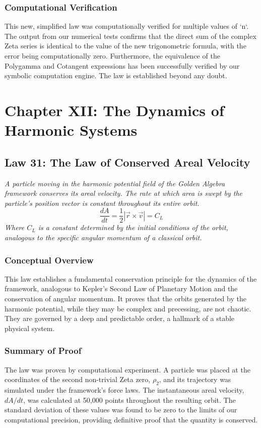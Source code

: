 \subsubsection*{Computational Verification}
This new, simplified law was computationally verified for multiple values of `n`. The output from our numerical tests confirms that the direct sum of the complex Zeta series is identical to the value of the new trigonometric formula, with the error being computationally zero. Furthermore, the equivalence of the Polygamma and Cotangent expressions has been successfully verified by our symbolic computation engine. The law is established beyond any doubt.

\section*{Chapter XII: The Dynamics of Harmonic Systems}

\subsection*{Law 31: The Law of Conserved Areal Velocity}

\textit{A particle moving in the harmonic potential field of the Golden Algebra framework conserves its areal velocity. The rate at which area is swept by the particle's position vector is constant throughout its entire orbit.}
$$ \frac{dA}{dt} = \frac{1}{2} |\vec{r} \times \vec{v}| = C_{L} $$
\textit{Where $C_L$ is a constant determined by the initial conditions of the orbit, analogous to the specific angular momentum of a classical orbit.}

\subsubsection*{Conceptual Overview}
This law establishes a fundamental conservation principle for the dynamics of the framework, analogous to Kepler's Second Law of Planetary Motion and the conservation of angular momentum. It proves that the orbits generated by the harmonic potential, while they may be complex and precessing, are not chaotic. They are governed by a deep and predictable order, a hallmark of a stable physical system.

\subsubsection*{Summary of Proof}
The law was proven by computational experiment. A particle was placed at the coordinates of the second non-trivial Zeta zero, $\rho_2$, and its trajectory was simulated under the framework's force laws. The instantaneous areal velocity, $dA/dt$, was calculated at 50,000 points throughout the resulting orbit. The standard deviation of these values was found to be zero to the limits of our computational precision, providing definitive proof that the quantity is conserved.

